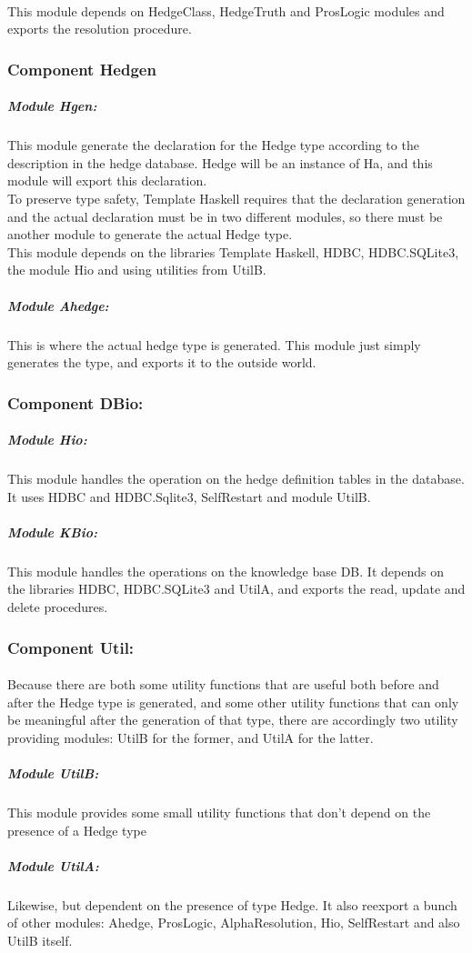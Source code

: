 \documentclass[../gr-final.tex]{subfiles}
\begin{document}
\paragraph{}This module depends on HedgeClass, HedgeTruth and ProsLogic modules and exports the resolution procedure.

\subsubsection{Component Hedgen}

\subparagraph{Module Hgen:} This module generate the declaration for the Hedge type
according to the description in the hedge database. Hedge will be an
instance of Ha, and this module will export this declaration.\\
To preserve type safety, Template Haskell requires that the declaration
generation and the actual declaration must be in two different
modules, so there must be another module to generate the actual Hedge type.\\
This module depends on the libraries Template Haskell, HDBC,
HDBC.SQLite3, the module Hio and using utilities from UtilB.\\
\subparagraph{Module Ahedge:} This is where the actual hedge type is
generated. This module just simply generates the type, and exports it
to the outside world.

\subsubsection{Component DBio:}
\subparagraph{Module Hio:} This module handles the operation on the
hedge definition tables in the database. It uses HDBC and
HDBC.Sqlite3, SelfRestart and module UtilB.
\subparagraph{Module KBio:} This module handles the operations on the
knowledge base DB. It depends on the libraries HDBC, HDBC.SQLite3 and UtilA, and exports the read, update and delete procedures.
\subsubsection{Component Util:}
\paragraph{} Because there are both some utility functions that are useful
both before and after the Hedge type is generated, and some other
utility functions that can only be meaningful after the generation of
that type, there are accordingly two utility providing modules: UtilB
for the former, and UtilA for the latter.
\subparagraph{Module UtilB:} This module provides some small utility
functions that don't depend on the presence of a Hedge type
\subparagraph{Module UtilA:} Likewise, but dependent on the presence of
type Hedge. It also reexport a bunch of other modules: Ahedge,
ProsLogic, AlphaResolution, Hio, SelfRestart and also UtilB itself.
\end{document}
